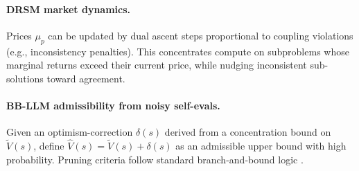 \paragraph{DRSM market dynamics.}
Prices $\mu_p$ can be updated by dual ascent steps proportional to coupling violations (e.g., inconsistency penalties). This concentrates compute on subproblems whose marginal returns exceed their current price, while nudging inconsistent sub-solutions toward agreement.

\paragraph{BB-LLM admissibility from noisy self-evals.}
Given an optimism-correction $\delta(s)$ derived from a concentration bound on $\tilde{V}(s)$, define $\hat{V}(s)=\tilde{V}(s)+\delta(s)$ as an admissible upper bound with high probability. Pruning criteria follow standard branch-and-bound logic \cite{land1960bb}.




